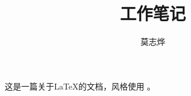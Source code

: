 \documentclass{hitec}
\title{工作笔记}
\author{莫志烨}
\begin{document}
\begin{titlepage}
\maketitle
这是一篇关于\LaTeX 的文档，风格使用 \HT 。
\end{titlepage}

%
\tableofcontents
\newpage
\newpage










\end{document}
